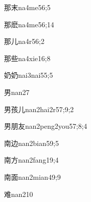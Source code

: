 \begin{verbete}{那末}{na4me5}{6;5}
\end{verbete}

\begin{verbete}{那麽}{na4me5}{6;14}
\end{verbete}

\begin{verbete}{那儿}{na4r5}{6;2}
\end{verbete}

\begin{verbete}{那些}{na4xie1}{6;8}
\end{verbete}

\begin{verbete}{奶奶}{nai3nai5}{5;5}
\end{verbete}

\begin{verbete}{男}{nan2}{7}
\end{verbete}

\begin{verbete}{男孩儿}{nan2hai2r5}{7;9;2}
\end{verbete}

\begin{verbete}{男朋友}{nan2peng2you5}{7;8;4}
\end{verbete}

\begin{verbete}{南边}{nan2bian5}{9;5}
\end{verbete}

\begin{verbete}{南方}{nan2fang1}{9;4}
\end{verbete}

\begin{verbete}{南面}{nan2mian4}{9;9}
\end{verbete}

\begin{verbete}{难}{nan2}{10}
\end{verbete}

